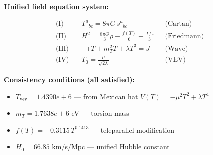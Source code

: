 
\textbf{Unified field equation system:}

\begin{align}
  \text{(I)} \quad & T^a{}_{bc} = 8\pi G \, s^a{}_{bc} && \text{(Cartan)} \\
  \text{(II)} \quad & H^2 = \frac{8\pi G}{3}\rho - \frac{f(T)}{6} + \frac{Tf_T}{3} && \text{(Friedmann)} \\
  \text{(III)} \quad & \Box T + m_T^2 T + \lambda T^3 = J && \text{(Wave)} \\
  \text{(IV)} \quad & T_0 = \frac{\mu}{\sqrt{2\lambda}} && \text{(VEV)}
\end{align}

\textbf{Consistency conditions (all satisfied):}
\begin{itemize}
  \item $T_{\text{vev}} = 1.4390e+6$ — from Mexican hat $V(T) = -\mu^2 T^2 + \lambda T^4$
  \item $m_T = 1.7638e+6$ eV — torsion mass
  \item $f(T) = -0.3115 \, T^{0.1413}$ — teleparallel modification
  \item $H_0 = 66.85$ km/s/Mpc — unified Hubble constant
\end{itemize}
